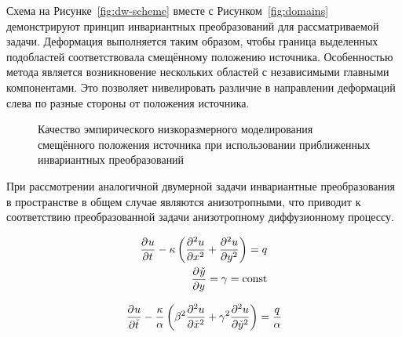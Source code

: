 Схема на Рисунке~\ref{fig:dw-scheme} вместе с Рисунком~\ref{fig:domains} демонстрируют принцип инвариантных преобразований для рассматриваемой задачи. Деформация выполняется таким образом, чтобы граница выделенных подобластей соответствовала смещённому положению источника. Особенностью метода является возникновение нескольких областей с независимыми главными компонентами. Это позволяет нивелировать различие в направлении деформаций слева по разные стороны от положения источника.
\begin{figure}[ht]
    \caption{Качество эмпирического низкоразмерного моделирования смещённого положения источника при использовании приближенных инвариантных преобразований~\cite{Elizarev2022}}\label{fig:q-domains}
\end{figure}

При рассмотрении аналогичной двумерной задачи инвариантные преобразования в пространстве в общем случае являются анизотропными, что приводит к соответствию преобразованной задачи анизотропному диффузионному процессу.

\begin{align}
    \deriv{u}{t} - \kappa \left(\deriv[2]{u}{x} + \deriv[2]{u}{y} \right) = q \\
    \deriv{\check{y}}{y} = \gamma = \text{const}
\end{align}

\begin{equation}
    \deriv{u}{\check{t}} - \frac{\kappa }{\alpha} \left(
        \beta^2 \deriv[2]{u}{\check{x}} + \gamma^2 \deriv[2]{u}{\check{y}}
        \right) = \frac{q}{\alpha}
\end{equation}

